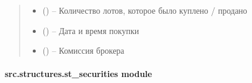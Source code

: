 \documentclass[letterpaper,10pt,english,openany,oneside]{sphinxmanual}
\begin{document}
\begin{fulllineitems}
\begin{fulllineitems}
\begin{quote}
\begin{description}
\begin{itemize}
\item {} 
\sphinxAtStartPar
{} () – Количество лотов, которое было куплено / продано

\item {} 
\sphinxAtStartPar
{} (\sphinxstyleliteralemphasis{\sphinxupquote{{[}}}\sphinxstyleliteralemphasis{\sphinxupquote{{]}}}) – Дата и время покупки

\item {} 
\sphinxAtStartPar
{} () – Комиссия брокера

\end{itemize}

\end{description}\end{quote}

\end{fulllineitems}


\end{fulllineitems}



\paragraph{src.structures.st\_securities module}
\label{\detokenize{src.structures:module-src.structures.st_securities}}\label{\detokenize{src.structures:src-structures-st-securities-module}}
\end{document}
